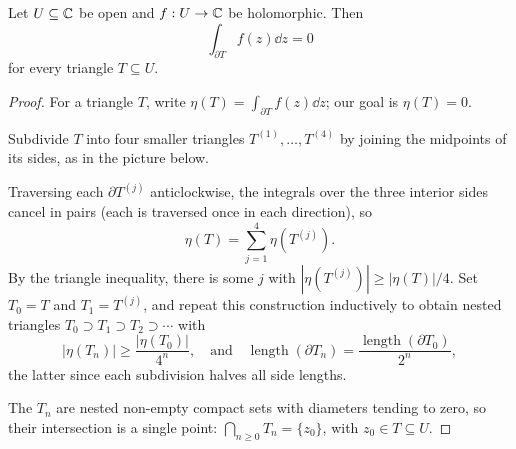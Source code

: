 \documentclass[a4paper]{scrartcl}
\begin{document}
\begin{theorem}
    Let $U \subseteq \mathbb{C}$ be open and $f: U \rightarrow \mathbb{C}$ be holomorphic. Then
    $$
    \int_{\partial T} f(z) \dd z = 0
    $$
    for every triangle $T \subseteq U$.
\end{theorem}
\begin{proof}
    For a triangle $T$, write $\eta(T) = \int_{\partial T} f(z) \dd z$; our goal is $\eta(T) = 0$.

    Subdivide $T$ into four smaller triangles $T^{(1)}, \dots, T^{(4)}$ by joining the midpoints of its sides, as in the picture below.

    \begin{center}
    \end{center}

    Traversing each $\partial T^{(j)}$ anticlockwise, the integrals over the three interior sides cancel in pairs (each is traversed once in each direction), so
    $$
    \eta(T) = \sum_{j = 1}^4 \eta(T^{(j)}).
    $$
    By the triangle inequality, there is some $j$ with $|\eta(T^{(j)})| \geq |\eta(T)|/4$. Set $T_0 = T$ and $T_1 = T^{(j)}$, and repeat this construction inductively to obtain nested triangles $T_0 \supset T_1 \supset T_2 \supset \cdots$ with
    $$
    |\eta(T_n)| \geq \frac{|\eta(T_0)|}{4^n}, \quad \text{and} \quad \operatorname{length}(\partial T_n) = \frac{\operatorname{length}(\partial T_0)}{2^n},
    $$
    the latter since each subdivision halves all side lengths.

    The $T_n$ are nested non-empty compact sets with diameters tending to zero, so their intersection is a single point: $\bigcap_{n \geq 0} T_n = \{z_0\}$, with $z_0 \in T \subseteq U$.


\end{proof}
\end{document}
